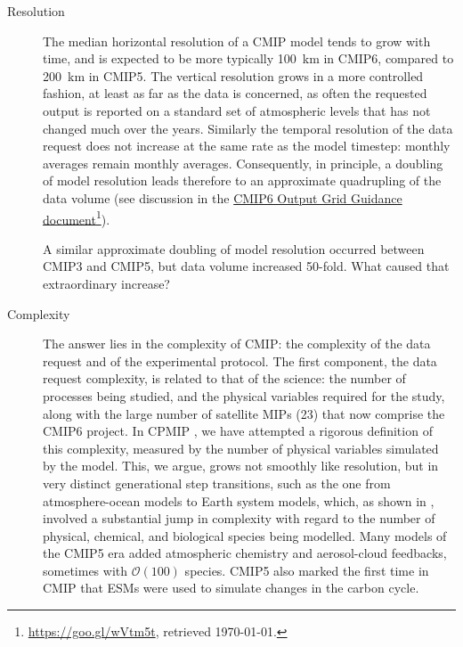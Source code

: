 \documentclass[gmd,manuscript]{copernicus}
\newcommand{\urlref}[2] {\href{#1}{#2}\footnote{\url{#1}, retrieved \today.}}
\begin{document}
\begin{description}
\item[Resolution] The median horizontal resolution of a CMIP model
  tends to grow with time, and is expected to be more typically 100~km
  in CMIP6, compared to 200~km in CMIP5. The vertical resolution grows
  in a more controlled fashion, at least as far as the data is
  concerned, as often the requested output is reported on a standard
  set of atmospheric levels that has not changed much over the years.
  Similarly the temporal resolution of the data request does not
  increase at the same rate as the model timestep: monthly averages
  remain monthly averages. Consequently, in principle, a doubling of model resolution leads
  therefore to an approximate quadrupling of the data volume
  (see discussion in the
  \urlref{https://goo.gl/wVtm5t}{CMIP6 Output Grid Guidance
    document}).  

  A similar approximate doubling of model resolution occurred between CMIP3 
  and CMIP5, but data volume increased 50-fold. What caused that
  extraordinary increase?
\item[Complexity] The answer lies in the complexity of CMIP: the
  complexity of the data request and of the experimental protocol.
  The first component, the
  data request complexity, is related to that of the science: the
  number of processes being studied, and the physical variables
  required for the study, along with the large number of satellite MIPs
  (23) that now comprise the CMIP6 project. In CPMIP \citep{ref:balajietal2017}, we have
  attempted a rigorous definition of this complexity, measured by the
  number of physical variables simulated by the model. This, we argue,
  grows not smoothly like resolution, but in very distinct
  generational step transitions, such as the one from atmosphere-ocean
  models to Earth system models, which, as shown in \cite{ref:balajietal2017},
  involved a substantial jump in
  complexity with regard to the number of physical, chemical, and biological species
  being modelled.
   Many models of the CMIP5 era added
  atmospheric chemistry and aerosol-cloud feedbacks, sometimes with
  $\mathcal{O}(100)$ species. CMIP5 also marked the first time in CMIP
  that ESMs were used to simulate changes in the carbon cycle.


\end{description}
\end{document}
